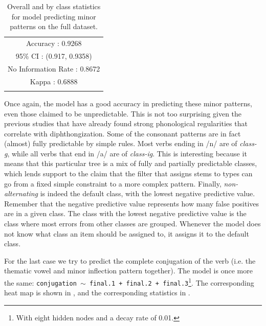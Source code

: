 \begin{table}[!htpb]
    \small
  \centering
  \begin{tabular}{lrrrrrr}
    \lsptoprule
    \multicolumn{7}{c}{Overall Statistics}           \\
    \midrule
    \multicolumn{7}{c}{Accuracy : 0.9268}            \\
    \multicolumn{7}{c}{95\% CI : (0.917, 0.9358)}    \\
    \multicolumn{7}{c}{No Information Rate : 0.8672} \\
    \multicolumn{7}{c}{Kappa : 0.6888}               \\
    \lspbottomrule
  \end{tabular}
  \caption{Overall and by class statistics for model predicting minor patterns on the full dataset.} \label{tab:spanish-verbs-minor-v-stats-full}
\end{table}

Once again, the model has a good accuracy in predicting these minor patterns, even those claimed to be unpredictable. This is not too surprising given the previous studies that have already found strong phonological regularities that correlate with diphthongization. Some of the consonant patterns are in fact (almost) fully predictable by simple rules. Most verbs ending in /n/ are of \textit{class-g}, while all verbs that end in /a/ are of \textit{class-ig}. This is interesting because it means that this particular tree is a mix of fully and partially predictable classes, which lends support to the claim that the filter that assigns stems to types can go from a fixed simple constraint to a more complex pattern. Finally, \textit{non-alternating} is indeed the default class, with the lowest negative predictive value. Remember that the negative predictive value represents how many false positives are in a given class. The class with the lowest negative predictive value is the class where most errors from other classes are grouped. Whenever the model does not know what class an item should be assigned to, it assigns it to the default class.

For the last case we try to predict the complete conjugation of the verb (i.e. the thematic vowel and minor inflection pattern together). The model is once more the same: \texttt{conjugation $\sim$ final.1 + final.2 + final.3}\footnote{With eight hidden nodes and a decay rate of 0.01.}. The corresponding heat map is shown in , and the corresponding statistics in .

